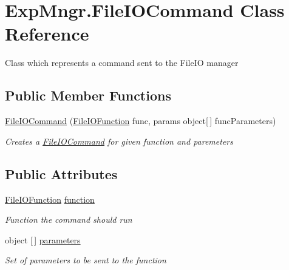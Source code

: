\hypertarget{class_exp_mngr_1_1_file_i_o_command}{}\section{Exp\+Mngr.\+File\+I\+O\+Command Class Reference}
\label{class_exp_mngr_1_1_file_i_o_command}


Class which represents a command sent to the File\+IO manager  


\subsection*{Public Member Functions}
\begin{DoxyCompactItemize}
\item 
\hyperlink{class_exp_mngr_1_1_file_i_o_command_aaa09bec6e574f13260c0a057cc1d8719}{File\+I\+O\+Command} (\hyperlink{namespace_exp_mngr_ada658a3bceadc7d2f4be3a749edae819}{File\+I\+O\+Function} func, params object\mbox{[}$\,$\mbox{]} func\+Parameters)
\begin{DoxyCompactList}\small\item\em Creates a \hyperlink{class_exp_mngr_1_1_file_i_o_command}{File\+I\+O\+Command} for given function and paremeters \end{DoxyCompactList}\end{DoxyCompactItemize}
\subsection*{Public Attributes}
\begin{DoxyCompactItemize}
\item 
\hyperlink{namespace_exp_mngr_ada658a3bceadc7d2f4be3a749edae819}{File\+I\+O\+Function} \hyperlink{class_exp_mngr_1_1_file_i_o_command_a664c3017f124453d6a73feae24459401}{function}
\begin{DoxyCompactList}\small\item\em Function the command should run \end{DoxyCompactList}\item 
object \mbox{[}$\,$\mbox{]} \hyperlink{class_exp_mngr_1_1_file_i_o_command_aa04302d7d0a41caee878d940ef4408ce}{parameters}
\begin{DoxyCompactList}\small\item\em Set of parameters to be sent to the function \end{DoxyCompactList}\end{DoxyCompactItemize}


